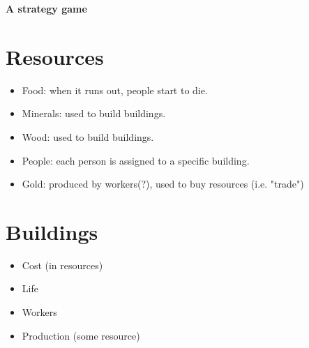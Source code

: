 \documentclass{article}
\begin{document}
  \begin{center}
    \LARGE{\textbf{A strategy game}}
  \end{center}

\section*{Resources}
\begin{itemize}
    \item Food: when it runs out, people start to die.
    \item Minerals: used to build buildings.
    \item Wood: used to build buildings.
    \item People: each person is assigned to a specific building.
    \item Gold: produced by workers(?), used to buy resources (i.e. "trade")
\end{itemize}

\section*{Buildings}
\begin{itemize}
    \item Cost (in resources)
    \item Life
    \item Workers
    \item Production (some resource)
\end{itemize}
\end{document}
